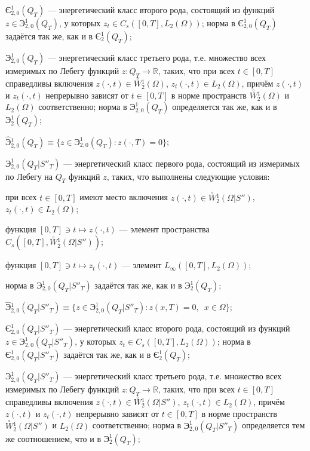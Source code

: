 \documentclass{report}
\begin{document}
$\textrm{Є}^{1}_{2,0}(Q_T)$ --- \glqq энергетический класс второго рода\grqq, состоящий из функций $z\in \textrm{Э}^{1}_{2,0}(Q_T)$, у которых
$z_t\in C_s([0,T],L_2(\Omega))$; норма в $\textrm{Є}^{1}_{2,0}(Q_T)$ задаётся так же, как и в $\textrm{Є}^{1}_{2}(Q_T)$;


$\textbf{Э}^{1}_{2,0}(Q_T)$ --- \glqq энергетический класс третьего рода\grqq, т.е. множество всех измеримых по Лебегу функций $z\colon Q_T\to \mathbb{R}$, таких, что при всех $t\in[0,T]$
справедливы включения $z(\cdot,t)\in\stackrel{\circ}{W}\!\!\!^1_2(\Omega)$, $z_t(\cdot,t)\in L_2(\Omega)$, причём $z(\cdot,t)$ и $z_t(\cdot,t)$ непрерывно зависят от $t\in[0,T]$ в норме
пространств $\stackrel{\circ}{W}\!\!\!^1_2(\Omega)$ и $L_2(\Omega)$ соответственно; норма в $\textbf{Э}^{1}_{2,0}(Q_T)$ определяется так же, как и в $\textbf{Э}^{1}_{2}(Q_T)$;


$\hat{\textbf{Э}}{}^{1}_{2,0}(Q_T)\equiv\{z\in\textbf{Э}^{1}_{2,0}(Q_T):z(\cdot,T)=0\}$;


$\textrm{Э}^{1}_{2,0}(Q_T|S''_T)$ --- \glqq энергетический класс первого рода\grqq, состоящий из измеримых по Лебегу на $Q_T$ функций $z$, таких, что выполнены следующие условия:


при всех $t\in[0,T]$ имеют место включения $z(\cdot,t)\in\stackrel{\circ}{W}\!\!^1_2(\Omega|S'')$, $z_t(\cdot,t)\in L_2(\Omega)$;

функция $[0,T]\ni t\mapsto z(\cdot,t)$ --- элемент пространства $C_s([0,T],\stackrel{\circ}{W}\!\!^1_2(\Omega|S''))$;

функция  $[0,T]\ni t\mapsto z_t(\cdot,t)$ --- элемент $L_\infty([0,T],L_2(\Omega))$;

\noindent норма в  $\textrm{Э}^{1}_{2,0}(Q_T|S''_T)$ задаётся так же, как и в $\textrm{Э}^{1}_{2}(Q_T)$;


$\hat{\textrm{Э}}{}^{1}_{2,0}(Q_T|S''_T)\equiv\{z\in \textrm{Э}^{1}_{2,0}(Q_T|S''_T):z(x,T)=0,\,\,\,x\in\Omega\}$;


$\textrm{Є}^{1}_{2,0}(Q_T|S''_T)$ --- \glqq энергетический класс второго рода\grqq, состоящий из функций $z\in \textrm{Э}^{1}_{2,0}(Q_T|S''_T)$, у которых
$z_t\in C_s([0,T],L_2(\Omega))$; норма в $\textrm{Є}^{1}_{2,0}(Q_T|S''_T)$ задаётся так же, как и в $\textrm{Є}^{1}_{2}(Q_T)$;


$\textbf{Э}^{1}_{2,0}(Q_T|S''_T)$ --- \glqq энергетический класс третьего рода\grqq, т.е. множество всех измеримых по Лебегу функций $z\colon Q_T\to \mathbb{R}$, таких, что при всех
$t\in[0,T]$ справедливы включения $z(\cdot,t)\in\stackrel{\circ}{W}\!\!^1_2(\Omega|S'')$, $z_t(\cdot,t)\in L_2(\Omega)$, причём $z(\cdot,t)$ и $z_t(\cdot,t)$ непрерывно зависят от
$t\in[0,T]$ в норме пространств $\stackrel{\circ}{W}\!\!^1_2(\Omega|S'')$ и $L_2(\Omega)$ соответственно; норма в $\textbf{Э}^{1}_{2,0}(Q_T|S''_T)$ определяется
тем же соотношением, что и в $\textbf{Э}^{1}_{2}(Q_T)$;
\end{document}

